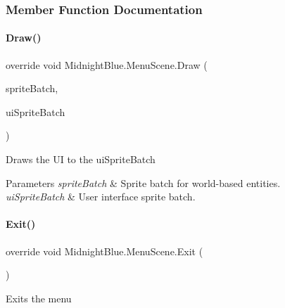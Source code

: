 \subsubsection{Member Function Documentation}
\hypertarget{class_midnight_blue_1_1_menu_scene_a600112073f48c763a50c802960f5fdaa}{}\label{class_midnight_blue_1_1_menu_scene_a600112073f48c763a50c802960f5fdaa} 
\paragraph{\texorpdfstring{Draw()}{Draw()}}
{\footnotesize\ttfamily override void Midnight\+Blue.\+Menu\+Scene.\+Draw (\begin{DoxyParamCaption}\item[{Sprite\+Batch}]{sprite\+Batch,  }\item[{Sprite\+Batch}]{ui\+Sprite\+Batch }\end{DoxyParamCaption})\hspace{0.3cm}{\ttfamily [inline]}}



Draws the UI to the ui\+Sprite\+Batch 


\begin{DoxyParams}{Parameters}
{\em sprite\+Batch} & Sprite batch for world-\/based entities.\\
\hline
{\em ui\+Sprite\+Batch} & User interface sprite batch.\\
\hline
\end{DoxyParams}
\hypertarget{class_midnight_blue_1_1_menu_scene_acc60288dc2dff4d612b7a63615165de5}{}\label{class_midnight_blue_1_1_menu_scene_acc60288dc2dff4d612b7a63615165de5} 
\paragraph{\texorpdfstring{Exit()}{Exit()}}
{\footnotesize\ttfamily override void Midnight\+Blue.\+Menu\+Scene.\+Exit (\begin{DoxyParamCaption}{ }\end{DoxyParamCaption})\hspace{0.3cm}{\ttfamily [inline]}}



Exits the menu 

